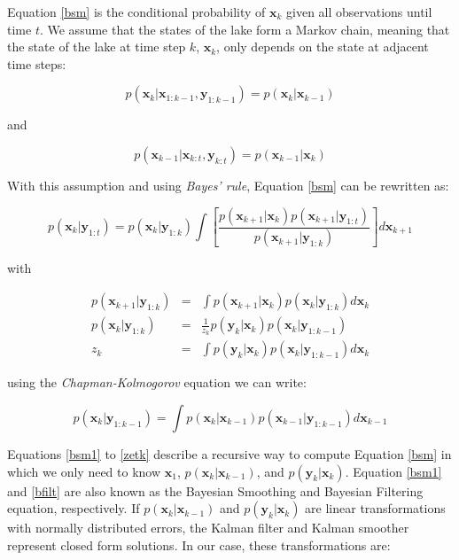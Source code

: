 \documentclass[doublespacing]{bmcart}
\newcommand{\bm}[1]{{\textbf{#1}}}
\begin{document}
Equation \ref{bsm} is the conditional probability of $\bm{x}_k$ given all
observations until time $t$. We assume that the states of the lake form a
Markov chain, meaning that the state of the lake at time step $k$, $\bm{x}_k$,
only depends on the state at adjacent time steps:

\begin{equation}\label{markov1}
    p(\bm{x}_k|\bm{x}_{1:k-1}, \bm{y}_{1:k-1}) = p(\bm{x}_k|\bm{x}_{k-1})
\end{equation}

and

\begin{equation}\label{markov2}
    p(\bm{x}_{k-1}|\bm{x}_{k:t}, \bm{y}_{k:t}) = p(\bm{x}_{k-1}|\bm{x}_{k})
\end{equation}

With this assumption and using \textit{Bayes' rule}, Equation \ref{bsm} can be
rewritten \cite{sarkkaBayesianFilteringSmoothing2013} as:

\begin{equation}\label{bsm1}
p(\bm{x}_k|\bm{y}_{1:t}) = p(\bm{x}_k|\bm{y}_{1:k})
    \int\left[\frac{p(\bm{x}_{k+1}|\bm{x}_k)p(\bm{x}_{k+1}|\bm{y}_{1:t})}{p(\bm{x}_{k+1}|\bm{y}_{1:k})}\right]d\bm{x}_{k+1}
\end{equation}

with

\begin{eqnarray}\label{bfilt1}
p(\bm{x}_{k+1}|\bm{y}_{1:k}) & = & \int p(\bm{x}_{k+1}|\bm{x}_k)p(\bm{x}_k|\bm{y}_{1:k})d\bm{x}_k \\
        \label{bfilt}
    p(\bm{x}_k|\bm{y}_{1:k}) & = & \frac{1}{z_k} p(\bm{y}_k|\bm{x}_k)p(\bm{x}_k|\bm{y}_{1:k-1}) \\
        \label{zetk}
    z_k & = & \int p(\bm{y}_k|\bm{x}_k) p(\bm{x}_k| \bm{y}_{1:k-1}) d\bm{x}_k  
\end{eqnarray}

using the \textit{Chapman-Kolmogorov} equation
\cite{sarkkaBayesianFilteringSmoothing2013} we can write:

\begin{equation}
p(\bm{x}_k|\bm{y}_{1:k-1}) = \int p(\bm{x}_k|\bm{x}_{k-1})p(\bm{x}_{k-1}|\bm{y}_{1:k-1})d\bm{x}_{k-1} 
\end{equation}

Equations \ref{bsm1} to \ref{zetk} describe a recursive way to compute Equation
\ref{bsm} in which we only need to know $\bm{x}_1$, $p(\bm{x}_k|\bm{x}_{k-1})$,
and $p(\bm{y}_k|\bm{x}_k)$. Equation \ref{bsm1} and \ref{bfilt} are also known
as the Bayesian Smoothing and Bayesian Filtering equation, respectively. If
$p(\bm{x}_k|\bm{x}_{k-1})$ and $p(\bm{y}_k|\bm{x}_k)$ are linear transformations
with normally distributed errors, the Kalman filter \cite{Kalman1960} and Kalman
smoother \cite{Rauch1965} represent closed form solutions. In our case, these
transformations are:
\end{document}
